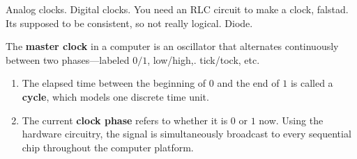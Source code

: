   Analog clocks. Digital clocks. 
  You need an RLC circuit to make a clock, falstad. 
  Its supposed to be consistent, so not really logical. Diode.

  \begin{definition}[Clock]
    \label{def:clock}
 
    The \textbf{master clock} in a computer is an oscillator that alternates continuously between two phases---labeled $0/1$, low/high,. tick/tock, etc. 
    \begin{enumerate}
      \item The elapsed time between the beginning of $0$ and the end of $1$ is called a \textbf{cycle}, which models one discrete time unit. 
      \item The current \textbf{clock phase} refers to whether it is $0$ or $1$ now. Using the hardware circuitry, the signal is simultaneously broadcast to every sequential chip throughout the computer platform. 
    \end{enumerate}
  \end{definition}


